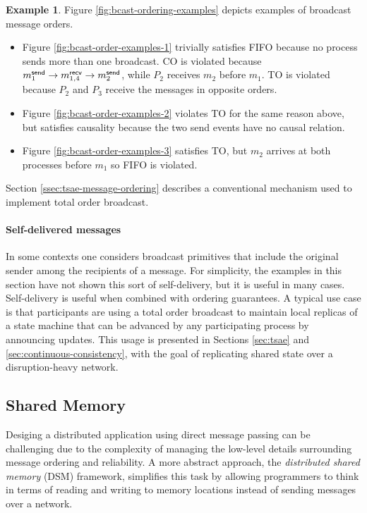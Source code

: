 \documentclass[]             %
{NASA}                       %
\theoremstyle{definition}
\newtheorem{example}[theorem]{Example}
\providecommand{\tightlist}{%
  \setlength{\itemsep}{0pt}\setlength{\parskip}{0pt}}
\begin{document}
\begin{example}
Figure \ref{fig:bcast-ordering-examples} depicts examples of broadcast
message orders.
\begin{itemize}
  \tightlist
\item Figure \ref{fig:bcast-order-examples-1} trivially satisfies FIFO
  because no process sends more than one broadcast. CO is violated
  because $m_{1}^{\mathsf{send}} \to m_{1,4}^{\mathsf{recv}} \to m_{2}^{\mathsf{send}}$, while $P_2$
  receives $m_2$ before $m_1$. TO is violated because $P_2$ and $P_3$
  receive the messages in opposite orders.
\item Figure \ref{fig:bcast-order-examples-2} violates TO for the same
  reason above, but satisfies causality because the two send events
  have no causal relation.
\item Figure \ref{fig:bcast-order-examples-3}
  satisfies TO, but $m_2$ arrives at both processes before $m_1$ so
  FIFO is violated.
\end{itemize}
\end{example}
Section \ref{ssec:tsae-message-ordering} describes a conventional
mechanism used to implement total order broadcast.
\paragraph{Self-delivered messages}
In some contexts one considers broadcast primitives that include the
original sender among the recipients of a message. For simplicity, the
examples in this section have not shown this sort of self-delivery,
but it is useful in many cases. Self-delivery is useful when combined
with ordering guarantees. A typical use case is that participants are
using a total order broadcast to maintain local replicas of a state
machine that can be advanced by any participating process by
announcing updates.  This usage is presented in Sections
\ref{sec:tsae} and \ref{sec:continuous-consistency}, with the goal of
replicating shared state over a disruption-heavy network.

\subsection{Shared Memory}
\label{ssec:shared-memory}
Desiging a distributed application using direct message passing can be
challenging due to the complexity of managing the low-level details
surrounding message ordering and reliability. A more abstract
approach, the \emph{distributed shared memory} (DSM) framework,
simplifies this task by allowing programmers to think in terms of
reading and writing to memory locations instead of sending messages
over a network.
\end{document}
